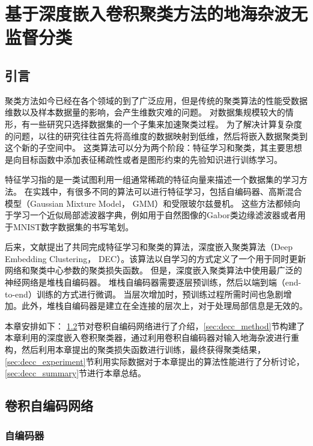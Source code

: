 \chapter{基于深度嵌入卷积聚类方法的地海杂波无监督分类}
\label{sec:decc}
\section{引言}
聚类方法如今已经在各个领域的到了广泛应用，但是传统的聚类算法的性能受数据维数以及样本数据量的影响，会产生维数灾难的问题。
对数据集规模较大的情形，有一些研究只选择数据集的一个子集来加速聚类过程。
为了解决计算复杂度的问题，以往的研究往往首先将高维度的数据映射到低维，然后将嵌入数据聚类到这个新的子空间中。
这类算法可以分为两个阶段：特征学习和聚类，其主要思想是向目标函数中添加表征稀疏性或者是图形约束的先验知识进行训练学习。

特征学习指的是一类试图利用一组通常稀疏的特征向量来描述一个数据集的学习方法。
在实践中，有很多不同的算法可以进行特征学习，包括自编码器、高斯混合模型（Gaussian Mixture Model， GMM）和受限玻尔兹曼机。
这些方法都倾向于学习一个近似局部滤波器字典，例如用于自然图像的Gabor类边缘滤波器或者用于MNIST数字数据集的书写笔划。

后来，文献\cite{xie2016unsupervised}提出了共同完成特征学习和聚类的算法，深度嵌入聚类算法（Deep Embedding Clustering， DEC）。该算法以自学习的方式定义了一个用于同时更新网络和聚类中心参数的聚类损失函数。
但是，深度嵌入聚类算法中使用最广泛的神经网络是堆栈自编码器。
堆栈自编码器需要逐层预训练，然后以端到端（end-to-end）训练的方式进行微调。
当层次增加时，预训练过程所需时间也急剧增加。此外，堆栈自编码器是建立在全连接的层次上，对于处理局部信息是无效的。

本章安排如下： \ref{sec:cae}节对卷积自编码网络进行了介绍，\ref{sec:decc_method}节构建了本章利用的深度嵌入卷积聚类器，通过利用卷积自编码器对输入地海杂波进行重构，然后利用本章提出的聚类损失函数进行训练，最终获得聚类结果，\ref{sec:decc_experiment}节利用实际数据对于本章提出的算法性能进行了分析讨论，\ref{sec:decc_summary}节进行本章总结。

\section{卷积自编码网络}
\label{sec:cae}
\subsection{自编码器}


